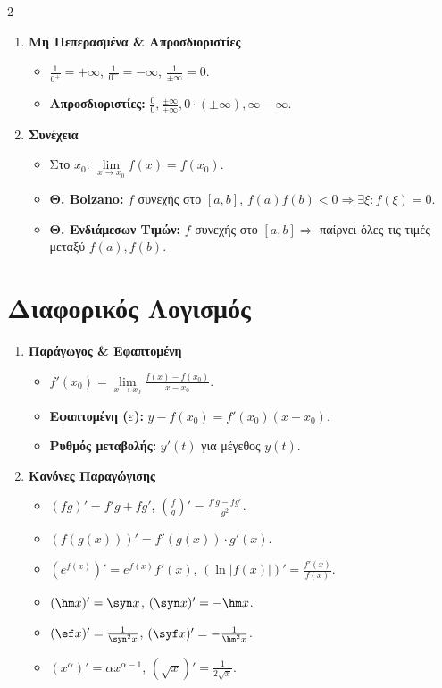 \documentclass[a4paper,11pt,twoside]{article}
\newcommand{\en}[1]{{\selectlanguage{english}#1\selectlanguage{greek}}}
\begin{document}
\begin{multicols}{2}
\begin{enumerate}
    \item \textbf{Μη Πεπερασμένα \& Απροσδιοριστίες}
    \begin{itemize}[leftmargin=0mm]
        \item $\frac{1}{0^+} = +\infty$, $\frac{1}{0^-} = -\infty$, $\frac{1}{\pm\infty} = 0$.
        \item \textbf{Απροσδιοριστίες:} $\frac{0}{0}, \frac{\pm\infty}{\pm\infty}, 0 \cdot (\pm\infty), \infty - \infty$.
    \end{itemize}

    \item \textbf{Συνέχεια}
    \begin{itemize}[leftmargin=0mm]
        \item {Στο $x_0$:} $\lim\limits_{x\to x_0} f(x) = f(x_0)$.
        \item \textbf{Θ. \en{Bolzano}:} $f$ συνεχής στο $[a,b]$, $f(a)f(b)<0 \Rightarrow \exists \xi: f(\xi)=0$.
        \item \textbf{Θ. Ενδιάμεσων Τιμών:} $f$ συνεχής στο $[a,b] \Rightarrow$ παίρνει όλες τις τιμές μεταξύ $f(a), f(b)$.
    \end{itemize}
\end{enumerate}

\section{Διαφορικός Λογισμός}
\begin{enumerate}
    \item \textbf{Παράγωγος \& Εφαπτομένη}
    \begin{itemize}[leftmargin=0mm]
        \item $f'(x_0) = \lim\limits_{x\to x_0} \frac{f(x)-f(x_0)}{x-x_0}$.
        \item \textbf{Εφαπτομένη ($\varepsilon$):} $y - f(x_0) = f'(x_0)(x - x_0)$.
        \item \textbf{Ρυθμός μεταβολής:} $y'(t)$ για μέγεθος $y(t)$.
    \end{itemize}

    \item \textbf{Κανόνες Παραγώγισης}
    \begin{itemize}[leftmargin=0mm]
        \item $(fg)' = f'g + fg'$, \quad $(\frac{f}{g})' = \frac{f'g - fg'}{g^2}$.
        \item $(f(g(x)))' = f'(g(x)) \cdot g'(x)$.
        \item $(e^{f(x)})' = e^{f(x)}f'(x)$, \quad $(\ln|f(x)|)' = \frac{f'(x)}{f(x)}$.
        \item $(\hm x)' = \syn x$, \quad $(\syn x)' = -\hm x$.
        \item $(\ef x)' = \frac{1}{\syn^2 x}$, \quad $(\syf x)' = -\frac{1}{\hm^2 x}$.
        \item $(x^\alpha)' = \alpha x^{\alpha-1}$, \quad $(\sqrt{x})' = \frac{1}{2\sqrt{x}}$.
    \end{itemize}


\end{enumerate}
\end{multicols}
\end{document}

